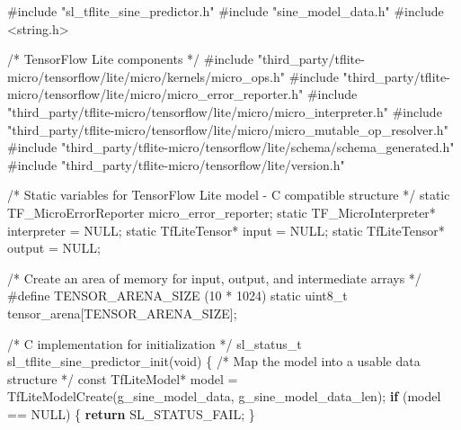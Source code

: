 \documentclass[
  9pt,
  letterpaper,
  abstract,
  titlepage]{scrbook}
\newenvironment{Shaded}{\begin{snugshade}}{\end{snugshade}}
\newcommand{\CommentTok}[1]{\textcolor[rgb]{0.37,0.37,0.37}{#1}}
\newcommand{\ControlFlowTok}[1]{\textcolor[rgb]{0.00,0.23,0.31}{\textbf{#1}}}
\newcommand{\DataTypeTok}[1]{\textcolor[rgb]{0.68,0.00,0.00}{#1}}
\newcommand{\DecValTok}[1]{\textcolor[rgb]{0.68,0.00,0.00}{#1}}
\newcommand{\ImportTok}[1]{\textcolor[rgb]{0.00,0.46,0.62}{#1}}
\newcommand{\NormalTok}[1]{\textcolor[rgb]{0.00,0.23,0.31}{#1}}
\newcommand{\OperatorTok}[1]{\textcolor[rgb]{0.37,0.37,0.37}{#1}}
\newcommand{\PreprocessorTok}[1]{\textcolor[rgb]{0.68,0.00,0.00}{#1}}
\begin{document}
\begin{Shaded}
\begin{Highlighting}[]
\PreprocessorTok{\#include }\ImportTok{"sl\_tflite\_sine\_predictor.h"}
\PreprocessorTok{\#include }\ImportTok{"sine\_model\_data.h"}
\PreprocessorTok{\#include }\ImportTok{\textless{}string.h\textgreater{}}

\CommentTok{/* TensorFlow Lite components */}
\PreprocessorTok{\#include }\ImportTok{"third\_party/tflite{-}micro/tensorflow/lite/micro/kernels/micro\_ops.h"}
\PreprocessorTok{\#include }\ImportTok{"third\_party/tflite{-}micro/tensorflow/lite/micro/micro\_error\_reporter.h"}
\PreprocessorTok{\#include }\ImportTok{"third\_party/tflite{-}micro/tensorflow/lite/micro/micro\_interpreter.h"}
\PreprocessorTok{\#include }\ImportTok{"third\_party/tflite{-}micro/tensorflow/lite/micro/micro\_mutable\_op\_resolver.h"}
\PreprocessorTok{\#include }\ImportTok{"third\_party/tflite{-}micro/tensorflow/lite/schema/schema\_generated.h"}
\PreprocessorTok{\#include }\ImportTok{"third\_party/tflite{-}micro/tensorflow/lite/version.h"}

\CommentTok{/* Static variables for TensorFlow Lite model {-} C compatible structure */}
\DataTypeTok{static}\NormalTok{ TF\_MicroErrorReporter micro\_error\_reporter}\OperatorTok{;}
\DataTypeTok{static}\NormalTok{ TF\_MicroInterpreter}\OperatorTok{*}\NormalTok{ interpreter }\OperatorTok{=}\NormalTok{ NULL}\OperatorTok{;}
\DataTypeTok{static}\NormalTok{ TfLiteTensor}\OperatorTok{*}\NormalTok{ input }\OperatorTok{=}\NormalTok{ NULL}\OperatorTok{;}
\DataTypeTok{static}\NormalTok{ TfLiteTensor}\OperatorTok{*}\NormalTok{ output }\OperatorTok{=}\NormalTok{ NULL}\OperatorTok{;}

\CommentTok{/* Create an area of memory for input, output, and intermediate arrays */}
\PreprocessorTok{\#define TENSOR\_ARENA\_SIZE }\OperatorTok{(}\DecValTok{10}\PreprocessorTok{ }\OperatorTok{*}\PreprocessorTok{ }\DecValTok{1024}\OperatorTok{)}
\DataTypeTok{static} \DataTypeTok{uint8\_t}\NormalTok{ tensor\_arena}\OperatorTok{[}\NormalTok{TENSOR\_ARENA\_SIZE}\OperatorTok{];}

\CommentTok{/* C implementation for initialization */}
\NormalTok{sl\_status\_t sl\_tflite\_sine\_predictor\_init}\OperatorTok{(}\DataTypeTok{void}\OperatorTok{)}
\OperatorTok{\{}
  \CommentTok{/* Map the model into a usable data structure */}
  \DataTypeTok{const}\NormalTok{ TfLiteModel}\OperatorTok{*}\NormalTok{ model }\OperatorTok{=}\NormalTok{ TfLiteModelCreate}\OperatorTok{(}\NormalTok{g\_sine\_model\_data}\OperatorTok{,}\NormalTok{ g\_sine\_model\_data\_len}\OperatorTok{);}
  \ControlFlowTok{if} \OperatorTok{(}\NormalTok{model }\OperatorTok{==}\NormalTok{ NULL}\OperatorTok{)} \OperatorTok{\{}
    \ControlFlowTok{return}\NormalTok{ SL\_STATUS\_FAIL}\OperatorTok{;}
  \OperatorTok{\}}


\end{Highlighting}
\end{Shaded}
\end{document}
